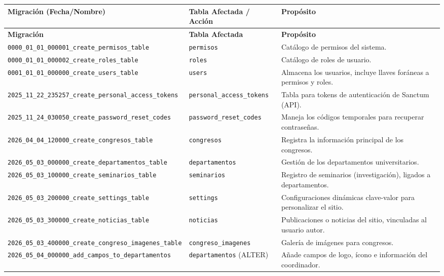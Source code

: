 \documentclass{article}
\begin{document}
\begin{longtable}{>{\raggedright\arraybackslash}p{6cm} >{\raggedright\arraybackslash}p{4cm} >{\raggedright\arraybackslash}p{5cm}}
\toprule
\textbf{Migración (Fecha/Nombre)} & \textbf{Tabla Afectada / Acción} & \textbf{Propósito} \\
\midrule
\endfirsthead
\toprule
\textbf{Migración} & \textbf{Tabla Afectada} & \textbf{Propósito} \\
\midrule
\endhead
\bottomrule
\endfoot
\bottomrule
\endlastfoot
\texttt{0000\_01\_01\_000001\_create\_permisos\_table} & \texttt{permisos} & Catálogo de permisos del sistema. \\
\texttt{0000\_01\_01\_000002\_create\_roles\_table} & \texttt{roles} & Catálogo de roles de usuario. \\
\texttt{0001\_01\_01\_000000\_create\_users\_table} & \texttt{users} & Almacena los usuarios, incluye llaves foráneas a permisos y roles. \\
\texttt{2025\_11\_22\_235257\_create\_personal\_access\_tokens} & \texttt{personal\_access\_tokens} & Tabla para tokens de autenticación de Sanctum (API). \\
\texttt{2025\_11\_24\_030050\_create\_password\_reset\_codes} & \texttt{password\_reset\_codes} & Maneja los códigos temporales para recuperar contraseñas. \\
\texttt{2026\_04\_04\_120000\_create\_congresos\_table} & \texttt{congresos} & Registra la información principal de los congresos. \\
\texttt{2026\_05\_03\_000000\_create\_departamentos\_table} & \texttt{departamentos} & Gestión de los departamentos universitarios. \\
\texttt{2026\_05\_03\_100000\_create\_seminarios\_table} & \texttt{seminarios} & Registro de seminarios (investigación), ligados a departamentos. \\
\texttt{2026\_05\_03\_200000\_create\_settings\_table} & \texttt{settings} & Configuraciones dinámicas clave-valor para personalizar el sitio. \\
\texttt{2026\_05\_03\_300000\_create\_noticias\_table} & \texttt{noticias} & Publicaciones o noticias del sitio, vinculadas al usuario autor. \\
\texttt{2026\_05\_03\_400000\_create\_congreso\_imagenes\_table} & \texttt{congreso\_imagenes} & Galería de imágenes para congresos. \\
\texttt{2026\_05\_04\_000000\_add\_campos\_to\_departamentos} & \texttt{departamentos} (ALTER) & Añade campos de logo, ícono e información del coordinador. \\

\end{longtable}
\end{document}
